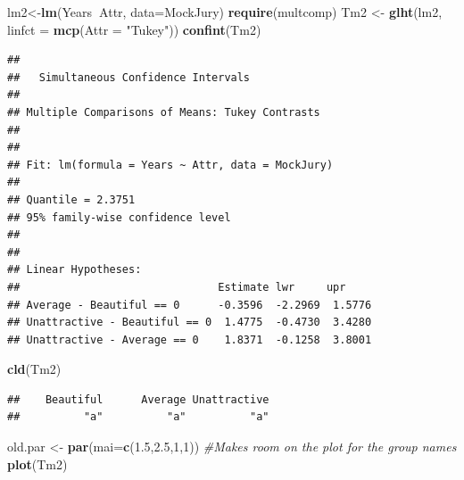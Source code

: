 \documentclass[]{book}
\newenvironment{Shaded}{\begin{snugshade}}{\end{snugshade}}
\newcommand{\KeywordTok}[1]{\textcolor[rgb]{0.13,0.29,0.53}{\textbf{#1}}}
\newcommand{\DataTypeTok}[1]{\textcolor[rgb]{0.13,0.29,0.53}{#1}}
\newcommand{\DecValTok}[1]{\textcolor[rgb]{0.00,0.00,0.81}{#1}}
\newcommand{\FloatTok}[1]{\textcolor[rgb]{0.00,0.00,0.81}{#1}}
\newcommand{\StringTok}[1]{\textcolor[rgb]{0.31,0.60,0.02}{#1}}
\newcommand{\CommentTok}[1]{\textcolor[rgb]{0.56,0.35,0.01}{\textit{#1}}}
\newcommand{\OperatorTok}[1]{\textcolor[rgb]{0.81,0.36,0.00}{\textbf{#1}}}
\newcommand{\NormalTok}[1]{#1}
\theoremstyle{definition}
\theoremstyle{definition}
\theoremstyle{remark}
\begin{document}
\begin{Shaded}
\begin{Highlighting}[]
\NormalTok{lm2<-}\KeywordTok{lm}\NormalTok{(Years}\OperatorTok{~}\NormalTok{Attr, }\DataTypeTok{data=}\NormalTok{MockJury)}
\KeywordTok{require}\NormalTok{(multcomp)}
\NormalTok{Tm2 <-}\StringTok{ }\KeywordTok{glht}\NormalTok{(lm2, }\DataTypeTok{linfct =} \KeywordTok{mcp}\NormalTok{(}\DataTypeTok{Attr =} \StringTok{"Tukey"}\NormalTok{))}
\KeywordTok{confint}\NormalTok{(Tm2)}
\end{Highlighting}
\end{Shaded}

\begin{verbatim}
## 
##   Simultaneous Confidence Intervals
## 
## Multiple Comparisons of Means: Tukey Contrasts
## 
## 
## Fit: lm(formula = Years ~ Attr, data = MockJury)
## 
## Quantile = 2.3751
## 95% family-wise confidence level
##  
## 
## Linear Hypotheses:
##                               Estimate lwr     upr    
## Average - Beautiful == 0      -0.3596  -2.2969  1.5776
## Unattractive - Beautiful == 0  1.4775  -0.4730  3.4280
## Unattractive - Average == 0    1.8371  -0.1258  3.8001
\end{verbatim}

\begin{Shaded}
\begin{Highlighting}[]
\KeywordTok{cld}\NormalTok{(Tm2)}
\end{Highlighting}
\end{Shaded}

\begin{verbatim}
##    Beautiful      Average Unattractive 
##          "a"          "a"          "a"
\end{verbatim}

\begin{Shaded}
\begin{Highlighting}[]
\NormalTok{old.par <-}\StringTok{ }\KeywordTok{par}\NormalTok{(}\DataTypeTok{mai=}\KeywordTok{c}\NormalTok{(}\FloatTok{1.5}\NormalTok{,}\FloatTok{2.5}\NormalTok{,}\DecValTok{1}\NormalTok{,}\DecValTok{1}\NormalTok{)) }\CommentTok{#Makes room on the plot for the group names}
\KeywordTok{plot}\NormalTok{(Tm2)}
\end{Highlighting}
\end{Shaded}
\end{document}
